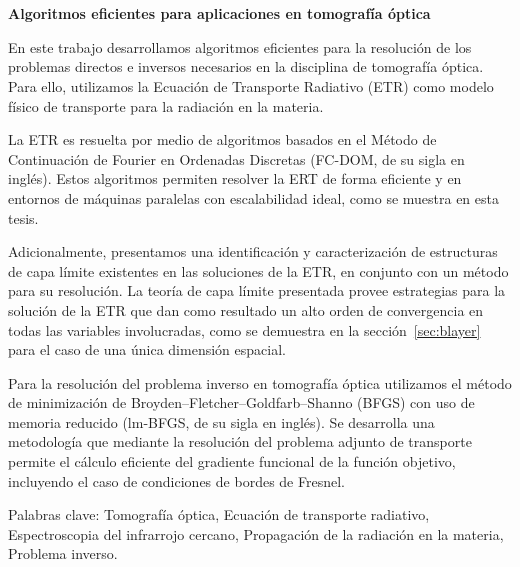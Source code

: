 \pagestyle{empty}
\chapter*{}

\begin{center}
\begin{large}
\textbf{Algoritmos eficientes para aplicaciones en tomografía óptica}
\end{large}
\end{center}

\vspace{1cm}
En este trabajo desarrollamos    
algoritmos eficientes para la resolución de los problemas directos 
e inversos necesarios en la disciplina de tomografía óptica. Para ello, utilizamos la Ecuación de Transporte 
Radiativo (ETR) como modelo físico de transporte para la radiación 
en la materia. 

La ETR es resuelta por medio de algoritmos basados en el Método  
de Continuación de Fourier en Ordenadas Discretas (FC-DOM, de su sigla en inglés). Estos algoritmos 
permiten resolver la ERT de forma eficiente y en entornos de máquinas paralelas 
con escalabilidad ideal, como se muestra en esta tesis. 

Adicionalmente, presentamos una identificación y caracterización de estructuras 
de capa límite existentes en las soluciones de la ETR, en conjunto con un método para su resolución. La teoría 
de capa límite presentada provee estrategias para la solución de la ETR 
que dan como resultado un 
alto orden de convergencia en todas las variables involucradas,
como se demuestra en la sección~\ref{sec:blayer} para el caso de una única dimensión espacial.

Para la resolución del problema inverso en tomografía óptica utilizamos el método de minimización 
de Broyden–Fletcher–Goldfarb–Shanno (BFGS) con uso de memoria reducido 
(lm-BFGS, de su sigla en inglés). 
Se desarrolla una metodología que mediante la resolución del 
problema adjunto de transporte permite el cálculo eficiente del gradiente 
funcional de la función objetivo, incluyendo el caso de condiciones de bordes 
de Fresnel.


\vspace{1cm}
\noindent
Palabras clave: 
Tomografía óptica,
Ecuación de transporte radiativo, 
Espectroscopia del infrarrojo cercano, 
Propagación de la radiación en la materia,
Problema inverso.

